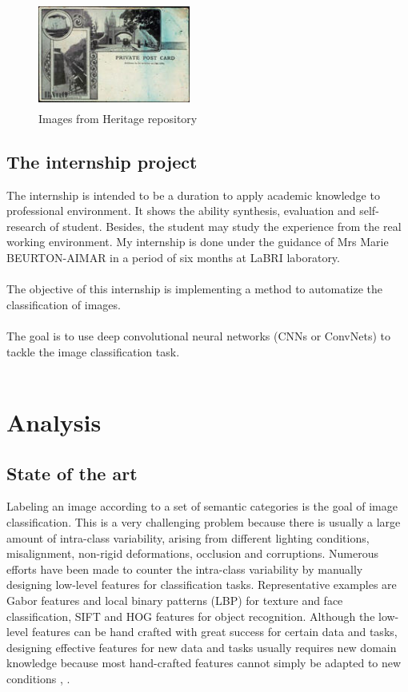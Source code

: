 \documentclass[hidelinks,12pt,a4paper]{report}
\begin{document}
\begin{center}
\begin{figure}[!htb]
{\begin{minipage}{\linewidth}
  \includegraphics[width=5cm, height=3.5cm]{images/sample/other_202}%
\end{minipage}%
}
  \caption{Images from Heritage repository}
\end{figure}
\end{center}

\newpage
\section{The internship project}

The internship is intended to be a duration to apply academic knowledge to professional environment. It shows the ability synthesis, evaluation and self-research of student. Besides, the student may study the experience from the real working environment. My internship is done under the guidance of Mrs Marie BEURTON-AIMAR in a period of six months at LaBRI laboratory.\\\\
The objective of this internship is implementing a method to automatize the classification of images.\\\\
The goal is to use deep convolutional neural networks (CNNs or ConvNets) to tackle the image classification task.\\\\
\newpage

\chapter{Analysis}
\section{State of the art}
Labeling an image according to a set of semantic categories is the goal of image classification. This is a very challenging problem because there is usually a large amount of intra-class variability, arising from different lighting conditions, misalignment, non-rigid deformations, occlusion and corruptions. Numerous efforts have been made to counter the intra-class variability by manually designing low-level features for classification tasks. Representative examples are Gabor features and local binary patterns (LBP) for texture and face classification\cite{Tan2007}, SIFT and HOG features for object recognition\cite{6558098}. Although the low-level features can be hand crafted with great success for certain data and tasks, designing effective features for new data and tasks usually requires new domain knowledge because most hand-crafted features cannot
simply be adapted to new conditions \cite{Hinton:2006:FLA:1161603.1161605}, \cite{DBLP:journals/corr/abs-1206-5538}.\\
\end{document}
